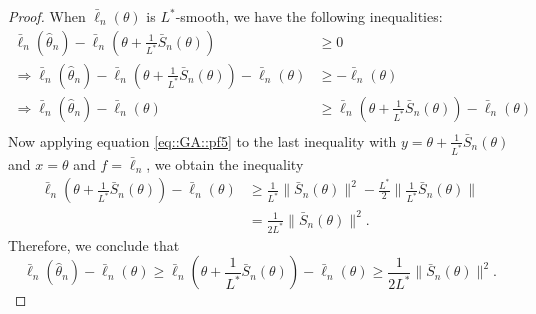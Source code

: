 \documentclass[aos, preprint]{imsart}
\theoremstyle{plain}
\theoremstyle{definition}
\let\hat\widehat
\begin{document}
\begin{appendix}
\begin{proof}
When $\bar \ell_n(\theta)$ is $L^*$-smooth, we have the following inequalities:
\begin{align*}
\bar \ell_n(\hat\theta_n) - \bar \ell_n\left(\theta + \frac{1}{L^*}\bar S_n(\theta)\right)&\geq 0\\
\Rightarrow \bar \ell_n(\hat\theta_n) - \bar \ell_n\left(\theta + \frac{1}{L^*}\bar S_n(\theta)\right) - \bar \ell_n(\theta) &\geq- \bar \ell_n\left(\theta \right)\\
\Rightarrow  \bar \ell_n(\hat\theta_n)  - \bar \ell_n(\theta) &\geq\bar \ell_n\left(\theta + \frac{1}{L^*}\bar S_n(\theta)\right)- \bar \ell_n\left(\theta \right)\\
\end{align*}
Now applying equation \eqref{eq::GA::pf5} to the last inequality with $y= \theta+\frac{1}{L^*}\bar S_n(\theta)$ and $x = \theta$ and $f = \bar \ell_n$,
we obtain the inequality
\begin{align*}
\bar \ell_n\left(\theta +\frac{1}{L^*}\bar S_n(\theta)\right)- \bar \ell_n\left(\theta \right) &\geq \frac{1}{L^*} \|\bar S_n(\theta)\|^2 - \frac{L^*}{2} \|\frac{1}{L^*}\bar S_n(\theta)\|\\
& = \frac{1}{2L^*} \|\bar S_n(\theta)\|^2.
\end{align*}
Therefore, we conclude that 
\begin{equation}
\bar \ell_n(\hat\theta_n)  - \bar \ell_n(\theta) \geq\bar \ell_n\left(\theta + \frac{1}{L^*}\bar S_n(\theta)\right)- \bar \ell_n\left(\theta \right)\geq \frac{1}{2L^*} \|\bar S_n(\theta)\|^2.
\label{eq::GA::pf6}
\end{equation}




\end{proof}
\end{appendix}
\end{document}
